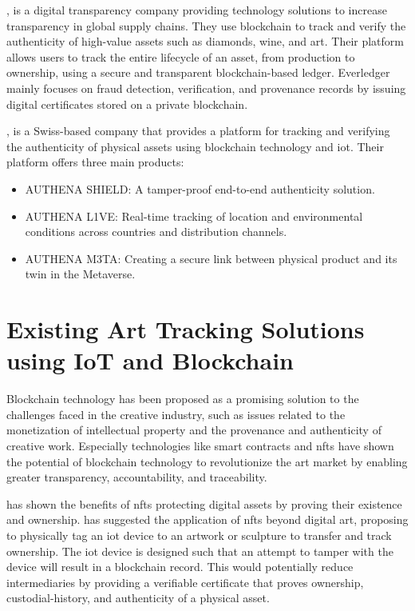 \textcite{everledger}, is a digital transparency company providing technology solutions to increase transparency in global supply chains. They use blockchain to track and verify the authenticity of high-value assets such as diamonds, wine, and art. Their platform allows users to track the entire lifecycle of an asset, from production to ownership, using a secure and transparent blockchain-based ledger. Everledger mainly focuses on fraud detection, verification, and provenance records by issuing digital certificates stored on a private blockchain.

\textcite{authena}, is a Swiss-based company that provides a platform for tracking and verifying the authenticity of physical assets using blockchain technology and \gls{iot}. Their platform offers three main products:
\begin{itemize}
    \item AUTHENA SHIELD: A tamper-proof end-to-end authenticity solution.
    \item AUTHENA L1VE: Real-time tracking of location and environmental conditions across countries and distribution channels.
    \item AUTHENA M3TA: Creating a secure link between physical product and its twin in the Metaverse.
\end{itemize}

\section{Existing Art Tracking Solutions using IoT and Blockchain}
Blockchain technology has been proposed as a promising solution to the challenges faced in the creative industry, such as issues related to the monetization of intellectual property and the provenance and authenticity of creative work. \cite{creativeindustry} Especially technologies like smart contracts and \glspl{nft} have shown the potential of blockchain technology to revolutionize the art market by enabling greater transparency, accountability, and traceability.  

\textcite{nftopportunities} has shown the benefits of \glspl{nft} protecting digital assets by proving their existence and ownership. \textcite{creativeindustry} has suggested the application of \glspl{nft} beyond digital art, proposing to physically tag an \gls{iot} device to an artwork or sculpture to transfer and track ownership. The \gls{iot} device is designed such that an attempt to tamper with the device will result in a blockchain record. This would potentially reduce intermediaries by providing a verifiable certificate that proves ownership, custodial-history, and authenticity of a physical asset.

